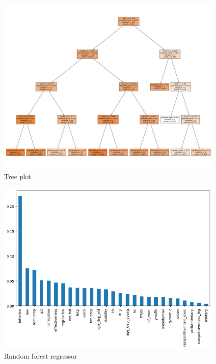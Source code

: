 \documentclass[10pt,leqno]{article}
\begin{document}
\begin{figure}  [h!]
\begin{center}
\caption{Tree plot}
\includegraphics[scale=0.3]{TreePlot_RF2.png}
\end{center}
\end{figure}  

\begin{figure}  [h!]
\begin{center}
\caption{Random forest regressor}
\includegraphics[scale=0.4]{RFRegressor_RF2.png}
\end{center}
\end{figure}  
\end{document}
